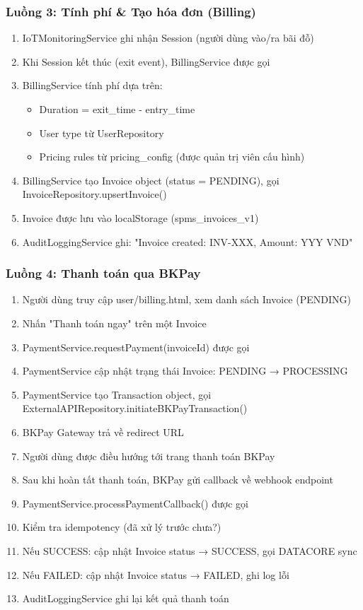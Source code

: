 \subsubsection{Luồng 3: Tính phí \& Tạo hóa đơn (Billing)}

\begin{enumerate}
    \item IoTMonitoringService ghi nhận Session (người dùng vào/ra bãi đỗ)
    \item Khi Session kết thúc (exit event), BillingService được gọi
    \item BillingService tính phí dựa trên:
    \begin{itemize}
        \item Duration = exit\_time - entry\_time
        \item User type từ UserRepository
        \item Pricing rules từ pricing\_config (được quản trị viên cấu hình)
    \end{itemize}
    \item BillingService tạo Invoice object (status = PENDING), gọi InvoiceRepository.upsertInvoice()
    \item Invoice được lưu vào localStorage (spms\_invoices\_v1)
    \item AuditLoggingService ghi: "Invoice created: INV-XXX, Amount: YYY VND"
\end{enumerate}

\subsubsection{Luồng 4: Thanh toán qua BKPay}

\begin{enumerate}
    \item Người dùng truy cập user/billing.html, xem danh sách Invoice (PENDING)
    \item Nhấn "Thanh toán ngay" trên một Invoice
    \item PaymentService.requestPayment(invoiceId) được gọi
    \item PaymentService cập nhật trạng thái Invoice: PENDING → PROCESSING
    \item PaymentService tạo Transaction object, gọi ExternalAPIRepository.initiateBKPayTransaction()
    \item BKPay Gateway trả về redirect URL
    \item Người dùng được điều hướng tới trang thanh toán BKPay
    \item Sau khi hoàn tất thanh toán, BKPay gửi callback về webhook endpoint
    \item PaymentService.processPaymentCallback() được gọi
    \item Kiểm tra idempotency (đã xử lý trước chưa?)
    \item Nếu SUCCESS: cập nhật Invoice status → SUCCESS, gọi DATACORE sync
    \item Nếu FAILED: cập nhật Invoice status → FAILED, ghi log lỗi
    \item AuditLoggingService ghi lại kết quả thanh toán
\end{enumerate}


